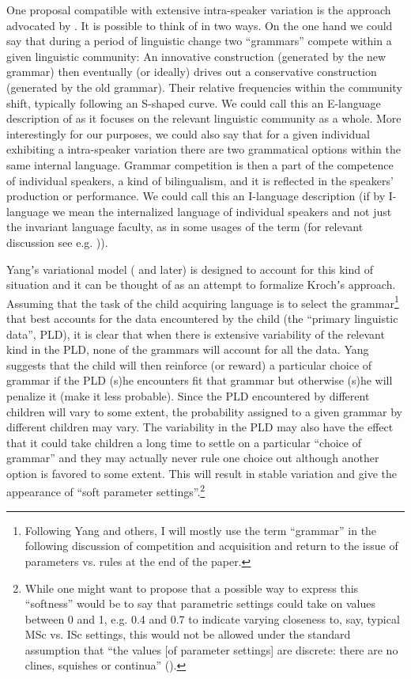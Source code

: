 \documentclass[output=paper]{LSP/langsci}
\begin{document}
One proposal compatible with extensive intra-speaker variation is the  approach advocated by \citet{Kroch1989,Kroch2001}. It is possible to think of  in two ways. On the one hand we could say that during a period of linguistic change two “grammars” compete within a given linguistic community: An innovative construction (generated by the new grammar) then eventually (or ideally) drives out a conservative construction (generated by the old grammar). Their relative frequencies within the community shift, typically following an S-shaped curve. We could call this an E-language description of  as it focuses on the relevant linguistic community as a whole. More interestingly for our purposes, we could also say that for a given individual exhibiting a intra-speaker variation there are two grammatical options within the same internal language. Grammar competition is then a part of the competence of individual speakers, a kind of bilingualism, and it is reflected in the speakers’ production or performance. We could call this an I-language description (if by I-language we mean the internalized language of individual speakers and not just the invariant  language faculty, as in some usages of the term (for relevant discussion see e.g. \citealt{Sigurðsson2011Uniformity})).

Yangʼs variational model (\citeyear{Yang2002} and later) is designed to account for this kind of situation and it can be thought of as an attempt to formalize Krochʼs  approach. Assuming that the task of the child acquiring language is to select the grammar\footnote{Following Yang and others, I will mostly use the term ``grammar'' in the following discussion of competition and acquisition and return to the issue of parameters vs. rules at the end of the paper.} that best accounts for the data encountered by the child (the “primary linguistic data”, PLD), it is clear that when there is extensive variability of the relevant kind in the PLD, none of the grammars will account for all the data. Yang suggests that the child will then reinforce (or reward) a particular choice of grammar if the PLD (s)he encounters fit that grammar but otherwise (s)he will penalize it (make it less probable). Since the PLD encountered by different children will vary to some extent, the probability assigned to a given grammar by different children may vary. The variability in the PLD may also have the effect that it could take children a long time to settle on a particular “choice of grammar” and they may actually never rule one choice out although another option is favored to some extent. This will result in stable variation and give the appearance of “soft parameter settings”.\footnote{While one might want to propose that a possible way to express this “softness” would be to say that parametric settings could take on values between 0 and 1, e.g. 0.4 and 0.7 to indicate varying closeness to, say, typical MSc vs. ISc settings, this would not be allowed under the standard assumption that “the values [of parameter settings] are discrete: there are no clines, squishes or continua” (\citealt[541]{Roberts2005}).}
\end{document}
